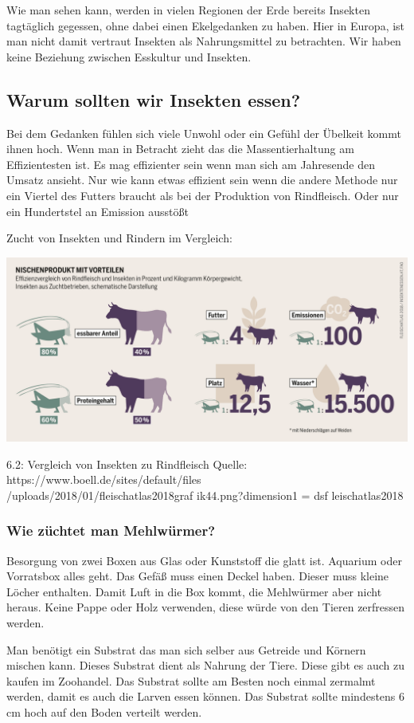 Wie man sehen kann, werden in vielen Regionen der Erde bereits Insekten
tagtäglich gegessen, ohne dabei einen Ekelgedanken zu haben. Hier in Europa,
ist man nicht damit vertraut Insekten als Nahrungsmittel zu betrachten. Wir
haben keine Beziehung zwischen Esskultur und Insekten.


\subsection{Warum sollten wir Insekten essen?}

Bei dem Gedanken fühlen sich viele Unwohl oder ein Gefühl der Übelkeit
kommt ihnen hoch. Wenn man in Betracht zieht das die Massentierhaltung
am Effizientesten ist. Es mag effizienter sein wenn man sich am Jahresende
den Umsatz ansieht. Nur wie kann etwas effizient sein wenn die andere Methode
nur ein Viertel des Futters braucht als bei der Produktion von Rindfleisch.
Oder nur ein Hundertstel an Emission ausstößt

Zucht von Insekten und Rindern im Vergleich:




{\includegraphics[width=0.8\linewidth]{figures/insekt_rind.png}}

6.2: Vergleich von Insekten zu Rindfleisch Quelle: https://www.boell.de/sites/default/files\\/uploads/2018/01/fleischatlas2018graf ik44.png?dimension1 =
dsf leischatlas2018


\subsubsection{Wie züchtet man Mehlwürmer?}
Besorgung von zwei Boxen aus Glas oder Kunststoff die glatt ist. Aquarium oder Vorratsbox alles geht. Das Gefäß muss einen Deckel haben. Dieser muss kleine Löcher enthalten. Damit Luft in die Box kommt, die Mehlwürmer aber nicht heraus. Keine Pappe oder Holz verwenden, diese würde von den Tieren zerfressen werden.

Man benötigt ein Substrat das man sich selber aus Getreide und Körnern mischen kann. Dieses Substrat dient als Nahrung der Tiere. Diese gibt es auch zu kaufen im Zoohandel. Das Substrat sollte am Besten noch einmal zermalmt werden, damit es auch die Larven essen können. Das Substrat sollte mindestens 6 cm hoch auf den Boden verteilt werden. 

